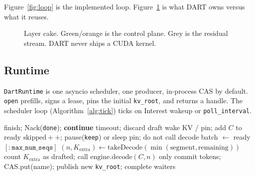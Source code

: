 \documentclass{article}
\theoremstyle{definition}
\newcommand{\cip}{\textsc{cip}}
\newcommand{\kvroot}{\texttt{kv\_root}}
\begin{document}
Figure~\ref{fig:loop} is the implemented loop.
Figure~\ref{fig:cake} is what DART owns versus what it reuses.

\begin{figure}[t]
\centering
{}
\caption{Layer cake. Green/orange is the control plane. Grey is the residual stream. DART never ships a CUDA kernel.}
\label{fig:cake}
\end{figure}

\subsection{Runtime}

\texttt{DartRuntime} is one asyncio scheduler, one producer, in-process CAS by default.
\texttt{open} prefills, signs a lease, pins the initial \kvroot{}, and returns a handle.
The scheduler loop (Algorithm~\ref{alg:tick}) ticks on Interest wakeup or \texttt{poll\_interval}.

\begin{algorithm}[t]
\caption{SchedulerTick: skip when $W{=}0$; decode at most granted credits.}
\label{alg:tick}
\begin{algorithmic}[1]
    \State finish; Nack(\texttt{done}); \textbf{continue}
  \EndIf
    \State timeout; discard draft
  \EndIf
    \State wake KV / pin; add $C$ to ready
  \Else
    \State $\mathrm{skipped}{+}{+}$; pause(\texttt{keep}) or sleep pin; do not call decode
  \EndIf
\EndFor
\State batch $\gets$ ready$[:\texttt{max\_num\_seqs}]$
  \State $(n, K_{\mathrm{extra}}) \gets \mathrm{takeDecode}(\min(\mathrm{segment}, \mathrm{remaining}))$
  \State count $K_{\mathrm{extra}}$ as drafted; call $\mathrm{engine.decode}(C, n)$ only
  \State commit tokens; CAS.put(name); publish new \kvroot{}; complete waiters
\EndFor
\end{algorithmic}
\end{algorithm}
\end{document}
